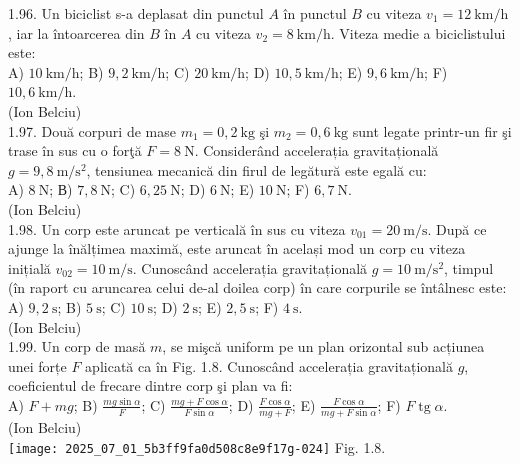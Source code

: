 1.96. Un biciclist s-a deplasat din punctul $A$ în punctul $B$ cu viteza $v_{1}=12 \mathrm{~km} / \mathrm{h}$, iar la întoarcerea din $B$ în $A$ cu viteza $v_{2}=8 \mathrm{~km} / \mathrm{h}$. Viteza medie a biciclistului este:\\ A) $10 \mathrm{~km} / \mathrm{h}$; B) $9,2 \mathrm{~km} / \mathrm{h}$; C) $20 \mathrm{~km} / \mathrm{h}$; D) $10,5 \mathrm{~km} / \mathrm{h}$; E) $9,6 \mathrm{~km} / \mathrm{h}$; F) $10,6 \mathrm{~km} / \mathrm{h}$.\\ (Ion Belciu)\\

1.97. Două corpuri de mase $m_{1}=0,2 \mathrm{~kg}$ şi $m_{2}=0,6 \mathrm{~kg}$ sunt legate printr-un fir şi trase în sus cu o forţă $F=8 \mathrm{~N}$. Considerând accelerația gravitațională $g=9,8 \mathrm{~m} / \mathrm{s}^{2}$, tensiunea mecanică din firul de legătură este egală cu:\\ A) $8 \mathrm{~N}$; В) $7,8 \mathrm{~N}$; C) $6,25 \mathrm{~N}$; D) $6 \mathrm{~N}$; E) $10 \mathrm{~N}$; F) $6,7 \mathrm{~N}$.\\ (Ion Belciu)\\

1.98. Un corp este aruncat pe verticală în sus cu viteza $v_{01}=20 \mathrm{~m} / \mathrm{s}$. După ce ajunge la înălțimea maximă, este aruncat în același mod un corp cu viteza inițială $v_{02}=10 \mathrm{~m} / \mathrm{s}$. Cunoscând accelerația gravitațională $g=10 \mathrm{~m} / \mathrm{s}^{2}$, timpul (în raport cu aruncarea celui de-al doilea corp) în care corpurile se întâlnesc este:\\ A) $9,2 \mathrm{~s}$; B) $5 \mathrm{~s}$; C) $10 \mathrm{~s}$; D) $2 \mathrm{~s}$; E) $2,5 \mathrm{~s}$; F) $4 \mathrm{~s}$.\\ (Ion Belciu)\\

1.99. Un corp de masă $m$, se mişcă uniform pe un plan orizontal sub acțiunea unei forțe $F$ aplicată ca în Fig. 1.8. Cunoscând accelerația gravitațională $g$, coeficientul de frecare dintre corp şi plan va fi:\\ A) $F+m g$; B) $\frac{m g \sin \alpha}{F}$; C) $\frac{m g+F \cos \alpha}{F \sin \alpha}$; D) $\frac{F \cos \alpha}{m g+F}$; E) $\frac{F \cos \alpha}{m g+F \sin \alpha}$; F) $F \operatorname{tg} \alpha$.\\ (Ion Belciu)\\ \texttt{[image: 2025\_07\_01\_5b3ff9fa0d508c8e9f17g-024]} Fig. 1.8.\\

